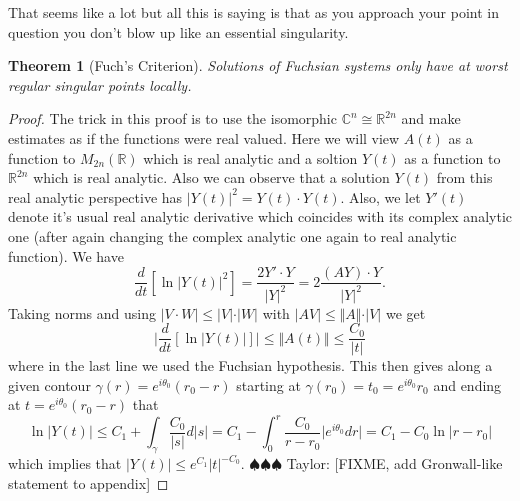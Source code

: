 \documentclass[]{book}
\newcommand{\taylor}[1]{{\color{blue} \sf $\spadesuit\spadesuit\spadesuit$ Taylor: [#1]}}
\numberwithin{equation}{section}
\newtheorem{theorem}{Theorem}[subsection]
\theoremstyle{definition}
\theoremstyle{remark}
\newcommand{\RR}{\mathbb{R}}
\newcommand{\CC}{\mathbb{C}}
\begin{document}
That seems like a lot but all this is saying is that as you approach your point in question you don't blow up like an essential singularity.
\begin{theorem}[Fuch's Criterion]
	Solutions of Fuchsian systems only have at worst regular singular points locally. 
\end{theorem}
\begin{proof}
	The trick in this proof is to use the isomorphic $\CC^n \cong \RR^{2n}$ and make estimates as if the functions were real valued. 
	Here we will view $A(t)$ as a function to $M_{2n}(\RR)$ which is real analytic and a soltion $Y(t)$ as a function to $\RR^{2n}$ which is real analytic. 
	Also we can observe that a solution $Y(t)$ from this real analytic perspective has $\vert Y(t) \vert^2 = Y(t) \cdot Y(t)$. 
	Also, we let $Y'(t)$ denote it's usual real analytic derivative which coincides with its complex analytic one (after again changing the complex analytic one again to real analytic function). 
	We have 
	$$\dfrac{d}{dt}\left[ \ln \vert Y(t) \vert^2 \right] = \dfrac{2 Y'\cdot Y}{\vert Y\vert^2} = 2\frac{ (A Y)\cdot Y}{\vert Y \vert^2}.$$
	 Taking norms and using $\vert V \cdot W \vert \leq \vert V \vert \cdot \vert W \vert$ with $\vert A V \vert \leq \Vert A \Vert \cdot \vert V \vert $ we get  
	  $$ \vert \dfrac{d}{dt}\left[ \ln \vert Y(t) \vert \right] \vert  \leq \Vert A(t) \Vert \leq \frac{C_0}{\vert t \vert}$$ 
	 where in the last line we used the Fuchsian hypothesis.
	 This then gives along a given contour $\gamma(r) = e^{i\theta_0}(r_0-r)$ starting at $\gamma(r_0) = t_0 = e^{i\theta_0}r_0$ and ending at $t=e^{i\theta_0}(r_0-r)$ that $$ \ln\vert Y(t) \vert \leq C_1 + \int_{\gamma}\frac{C_0}{\vert s \vert } d\vert s\vert =  C_1 - \int_{0}^r \frac{C_0}{r-r_0} \vert e^{i\theta_0}dr\vert = C_1 - C_0 \ln \vert r-r_0 \vert $$ 
	 which implies that $\vert Y(t) \vert \leq e^{C_1} \vert t \vert^{-C_0}$.	
	 \taylor{FIXME, add Gronwall-like statement to appendix}
\end{proof}


\end{document}
